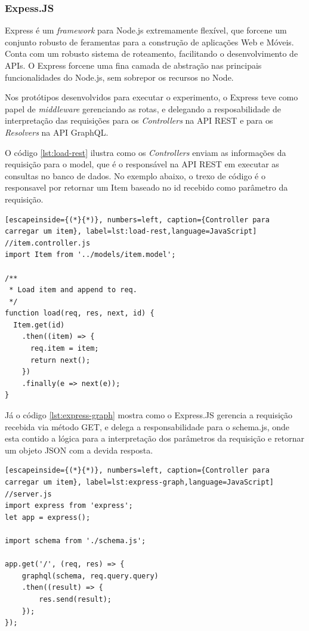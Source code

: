 \subsubsection*{Expess.JS}

Express é um \textit{framework} para Node.js extremamente flexível, que forcene um conjunto robusto de feramentas para a construção de aplicações Web e Móveis. Conta com um robusto sistema de roteamento, facilitando o desenvolvimento de APIs. O Express forcene uma fina camada de abstração nas principais funcionalidades do Node.js, sem sobrepor os recursos no Node.

Nos protótipos desenvolvidos para executar o experimento, o Express teve como papel de \textit{middleware} gerenciando as rotas, e delegando a resposabilidade de interpretação das requisições para os \textit{Controllers} na API REST e para os \textit{Resolvers} na API GraphQL.

O código \ref{lst:load-rest} ilustra como os \textit{Controllers} enviam as informações da requisição para o model, que é o responsável na API REST em executar as consultas no banco de dados. No exemplo abaixo, o trexo de código é o responsavel por retornar um Item baseado no id recebido como parâmetro da requisição.

\begin{lstlisting}[escapeinside={(*}{*)}, numbers=left, caption={Controller para carregar um item}, label=lst:load-rest,language=JavaScript]
//item.controller.js
import Item from '../models/item.model';

/**
 * Load item and append to req.
 */
function load(req, res, next, id) {
  Item.get(id)
    .then((item) => {
      req.item = item;
      return next();
    })
    .finally(e => next(e));
}

\end{lstlisting}

Já o código \ref{lst:express-graph} mostra como o Express.JS gerencia a requisição recebida via método GET, e delega a responsabilidade para o schema.js, onde esta contido a lógica para a interpretação dos parâmetros da requisição e retornar um objeto JSON com a devida resposta.

\begin{lstlisting}[escapeinside={(*}{*)}, numbers=left, caption={Controller para carregar um item}, label=lst:express-graph,language=JavaScript]
//server.js
import express from 'express';
let app = express();

import schema from './schema.js';

app.get('/', (req, res) => {
    graphql(schema, req.query.query)
    .then((result) => {
        res.send(result);
    });
});

\end{lstlisting}

